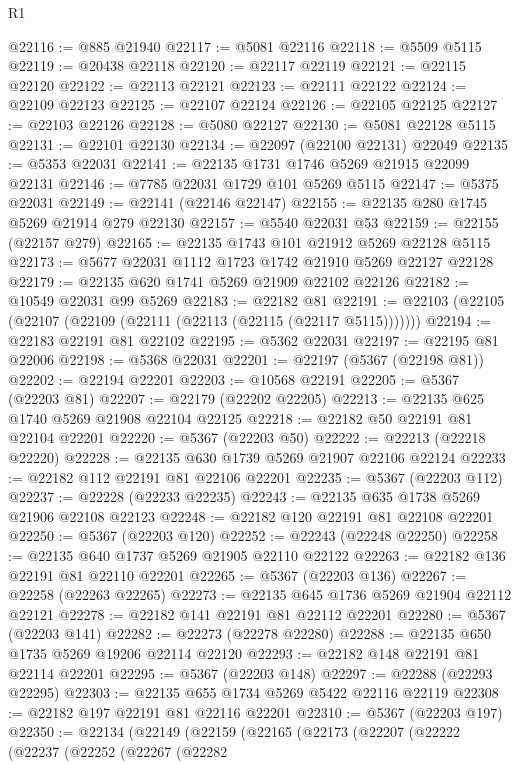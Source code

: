 \begin{lexlean}{R1}
\begin{coremodule}
@22116 := @885 @21940
@22117 := @5081 @22116
@22118 := @5509 @5115
@22119 := @20438 @22118
@22120 := @22117 @22119
@22121 := @22115 @22120
@22122 := @22113 @22121
@22123 := @22111 @22122
@22124 := @22109 @22123
@22125 := @22107 @22124
@22126 := @22105 @22125
@22127 := @22103 @22126
@22128 := @5080 @22127
@22130 := @5081 @22128 @5115
@22131 := @22101 @22130
@22134 := @22097 (@22100 @22131) @22049
@22135 := @5353 @22031
@22141 := @22135 @1731 @1746 @5269 @21915 @22099 @22131
@22146 := @7785 @22031 @1729 @101 @5269 @5115
@22147 := @5375 @22031
@22149 := @22141 (@22146 @22147)
@22155 := @22135 @280 @1745 @5269 @21914 @279 @22130
@22157 := @5540 @22031 @53
@22159 := @22155 (@22157 @279)
@22165 := @22135 @1743 @101 @21912 @5269 @22128 @5115
@22173 := @5677 @22031 @1112 @1723 @1742 @21910 @5269 @22127 @22128
@22179 := @22135 @620 @1741 @5269 @21909 @22102 @22126
@22182 := @10549 @22031 @99 @5269
@22183 := @22182 @81
@22191 := @22103 (@22105 (@22107 (@22109 (@22111 (@22113 (@22115 (@22117 @5115)))))))
@22194 := @22183 @22191 @81 @22102
@22195 := @5362 @22031
@22197 := @22195 @81 @22006
@22198 := @5368 @22031
@22201 := @22197 (@5367 (@22198 @81))
@22202 := @22194 @22201
@22203 := @10568 @22191
@22205 := @5367 (@22203 @81)
@22207 := @22179 (@22202 @22205)
@22213 := @22135 @625 @1740 @5269 @21908 @22104 @22125
@22218 := @22182 @50 @22191 @81 @22104 @22201
@22220 := @5367 (@22203 @50)
@22222 := @22213 (@22218 @22220)
@22228 := @22135 @630 @1739 @5269 @21907 @22106 @22124
@22233 := @22182 @112 @22191 @81 @22106 @22201
@22235 := @5367 (@22203 @112)
@22237 := @22228 (@22233 @22235)
@22243 := @22135 @635 @1738 @5269 @21906 @22108 @22123
@22248 := @22182 @120 @22191 @81 @22108 @22201
@22250 := @5367 (@22203 @120)
@22252 := @22243 (@22248 @22250)
@22258 := @22135 @640 @1737 @5269 @21905 @22110 @22122
@22263 := @22182 @136 @22191 @81 @22110 @22201
@22265 := @5367 (@22203 @136)
@22267 := @22258 (@22263 @22265)
@22273 := @22135 @645 @1736 @5269 @21904 @22112 @22121
@22278 := @22182 @141 @22191 @81 @22112 @22201
@22280 := @5367 (@22203 @141)
@22282 := @22273 (@22278 @22280)
@22288 := @22135 @650 @1735 @5269 @19206 @22114 @22120
@22293 := @22182 @148 @22191 @81 @22114 @22201
@22295 := @5367 (@22203 @148)
@22297 := @22288 (@22293 @22295)
@22303 := @22135 @655 @1734 @5269 @5422 @22116 @22119
@22308 := @22182 @197 @22191 @81 @22116 @22201
@22310 := @5367 (@22203 @197)
@22350 := @22134
    (@22149
      (@22159
        (@22165
          (@22173
            (@22207
              (@22222
                (@22237
                  (@22252
                    (@22267
                      (@22282

\end{coremodule}
\end{lexlean}

